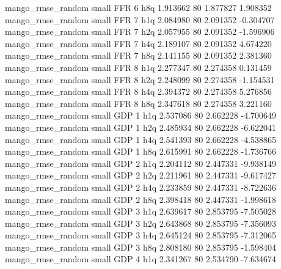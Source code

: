 mango_rmse_random      small      FFR                 6                  h8q 1.913662 80       1.877827           1.908352
mango_rmse_random      small      FFR                 7                  h1q 2.084980 80       2.091352          -0.304707
mango_rmse_random      small      FFR                 7                  h2q 2.057955 80       2.091352          -1.596906
mango_rmse_random      small      FFR                 7                  h4q 2.189107 80       2.091352           4.674220
mango_rmse_random      small      FFR                 7                  h8q 2.141155 80       2.091352           2.381360
mango_rmse_random      small      FFR                 8                  h1q 2.277347 80       2.274358           0.131459
mango_rmse_random      small      FFR                 8                  h2q 2.248099 80       2.274358          -1.154531
mango_rmse_random      small      FFR                 8                  h4q 2.394372 80       2.274358           5.276856
mango_rmse_random      small      FFR                 8                  h8q 2.347618 80       2.274358           3.221160
mango_rmse_random      small      GDP                 1                  h1q 2.537086 80       2.662228          -4.700649
mango_rmse_random      small      GDP                 1                  h2q 2.485934 80       2.662228          -6.622041
mango_rmse_random      small      GDP                 1                  h4q 2.541393 80       2.662228          -4.538865
mango_rmse_random      small      GDP                 1                  h8q 2.615991 80       2.662228          -1.736766
mango_rmse_random      small      GDP                 2                  h1q 2.204112 80       2.447331          -9.938149
mango_rmse_random      small      GDP                 2                  h2q 2.211961 80       2.447331          -9.617427
mango_rmse_random      small      GDP                 2                  h4q 2.233859 80       2.447331          -8.722636
mango_rmse_random      small      GDP                 2                  h8q 2.398418 80       2.447331          -1.998618
mango_rmse_random      small      GDP                 3                  h1q 2.639617 80       2.853795          -7.505028
mango_rmse_random      small      GDP                 3                  h2q 2.643868 80       2.853795          -7.356093
mango_rmse_random      small      GDP                 3                  h4q 2.645124 80       2.853795          -7.312065
mango_rmse_random      small      GDP                 3                  h8q 2.808180 80       2.853795          -1.598404
mango_rmse_random      small      GDP                 4                  h1q 2.341267 80       2.534790          -7.634674
